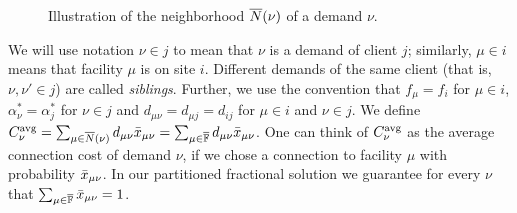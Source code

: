 \documentclass[oneside,final]{ucr}
\def\dsp{\def\baselinestretch{2.0}\large\normalsize}
\def\ssp{\def\baselinestretch{1.0}\large\normalsize}
\begin{document}
\ssp
\begin{figure}[ht]
  \centering
  \caption{Illustration of the neighborhood ${\overline{N}}(\nu)$ of a demand $\nu$.}
  \label{fig:neighborhood}
\end{figure}
\dsp
We will use notation $\nu\in j$ to
mean that $\nu$ is a demand of client $j$; similarly,
$\mu\in i$ means that facility $\mu$ is on site
$i$. Different demands of the same client (that is,
$\nu,\nu'\in j$) are called \emph{siblings}.  Further, we
use the convention that $f_\mu = f_i$ for $\mu\in i$,
$\alpha_\nu^\ast = \alpha_j^\ast$ for $\nu\in j$ and
$d_{\mu\nu} = d_{\mu j} = d_{ij}$ for $\mu\in i$ and $\nu\in
j$.  We define $C^{{\mbox{\scriptsize\rm avg}}}_{\nu}
=\sum_{\mu\in{\overline{N}}(\nu)}d_{\mu\nu}{\bar x}_{\mu\nu} =
\sum_{\mu\in\overline{\mathbb{F}}}d_{\mu\nu}{\bar x}_{\mu\nu}$.  One can
think of $C^{{\mbox{\scriptsize\rm avg}}}_{\nu}$ as the average connection cost of
demand $\nu$, if we chose a connection to facility $\mu$
with probability ${\bar x}_{\mu\nu}$. In our partitioned
fractional solution we guarantee for every $\nu$ that
$\sum_{\mu\in\overline{\mathbb{F}}} {\bar x}_{\mu\nu}=1$.
\end{document}
